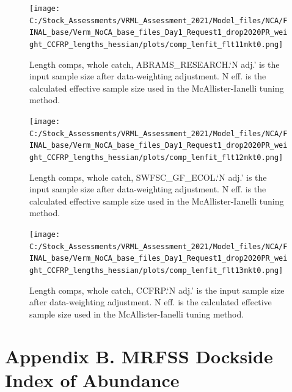 \documentclass[11pt,
  english,
]{article}
\begin{document}
\begin{figure}
\centering
\texttt{[image: C:/Stock\_Assessments/VRML\_Assessment\_2021/Model\_files/NCA/FINAL\_base/Verm\_NoCA\_base\_files\_Day1\_Request1\_drop2020PR\_weight\_CCFRP\_lengths\_hessian/plots/comp\_lenfit\_flt11mkt0.png]}
\caption{Length comps, whole catch, ABRAMS\_RESEARCH.`N adj.' is the input sample size after data-weighting adjustment. N eff. is the calculated effective sample size used in the McAllister-Ianelli tuning method.\label{fig:comp_lenfit_flt11mkt0}}
\end{figure}

\begin{figure}
\centering
\texttt{[image: C:/Stock\_Assessments/VRML\_Assessment\_2021/Model\_files/NCA/FINAL\_base/Verm\_NoCA\_base\_files\_Day1\_Request1\_drop2020PR\_weight\_CCFRP\_lengths\_hessian/plots/comp\_lenfit\_flt12mkt0.png]}
\caption{Length comps, whole catch, SWFSC\_GF\_ECOL.`N adj.' is the input sample size after data-weighting adjustment. N eff. is the calculated effective sample size used in the McAllister-Ianelli tuning method.\label{fig:comp_lenfit_flt12mkt0}}
\end{figure}

\begin{figure}
\centering
\texttt{[image: C:/Stock\_Assessments/VRML\_Assessment\_2021/Model\_files/NCA/FINAL\_base/Verm\_NoCA\_base\_files\_Day1\_Request1\_drop2020PR\_weight\_CCFRP\_lengths\_hessian/plots/comp\_lenfit\_flt13mkt0.png]}
\caption{Length comps, whole catch, CCFRP.`N adj.' is the input sample size after data-weighting adjustment. N eff. is the calculated effective sample size used in the McAllister-Ianelli tuning method.\label{fig:comp_lenfit_flt13mkt0}}
\end{figure}

\FloatBarrier


\hypertarget{appendix-b.-mrfss-dockside-index-of-abundance}{%
\section*{Appendix B. MRFSS Dockside Index of Abundance}\label{appendix-b.-mrfss-dockside-index-of-abundance}}

\leavevmode\tagmcend\tagstructend

\renewcommand{\thepage}{B\arabic{page}}
\renewcommand{\thefigure}{B\arabic{figure}}
\renewcommand{\thetable}{B\arabic{table}}
\setcounter{page}{1}
\setcounter{figure}{0}
\setcounter{table}{0}
\end{document}
